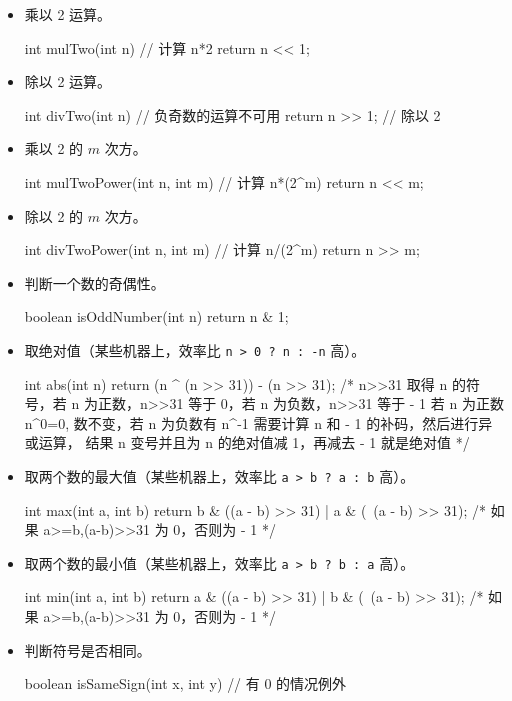 \begin{itemize}
\item 乘以 2 运算。
\begin{cppcode}
int mulTwo(int n) {  // 计算 n*2
  return n << 1;
}
\end{cppcode}
\item 除以 2 运算。
\begin{cppcode}
int divTwo(int n) {  // 负奇数的运算不可用
  return n >> 1;     // 除以 2
}
\end{cppcode}
\item 乘以 2 的 $m$ 次方。
\begin{cppcode}
int mulTwoPower(int n, int m) {  // 计算 n*(2^m)
  return n << m;
}
\end{cppcode}
\item 除以 2 的 $m$ 次方。
\begin{cppcode}
int divTwoPower(int n, int m) {  // 计算 n/(2^m)
  return n >> m;
}
\end{cppcode}
\item 判断一个数的奇偶性。
\begin{cppcode}
boolean isOddNumber(int n) { return n & 1; }
\end{cppcode}
\item 取绝对值（某些机器上，效率比 \texttt{n > 0 ? n : -n} 高）。
\begin{cppcode}
int abs(int n) {
  return (n ^ (n >> 31)) - (n >> 31);
  /* n>>31 取得 n 的符号，若 n 为正数，n>>31 等于 0，若 n 为负数，n>>31 等于 - 1
     若 n 为正数 n^0=0, 数不变，若 n 为负数有 n^-1
     需要计算 n 和 - 1 的补码，然后进行异或运算，
     结果 n 变号并且为 n 的绝对值减 1，再减去 - 1 就是绝对值 */
}
\end{cppcode}
\item 取两个数的最大值（某些机器上，效率比 \texttt{a > b ? a : b} 高）。
\begin{cppcode}
int max(int a, int b) {
  return b & ((a - b) >> 31) | a & (~(a - b) >> 31);
  /* 如果 a>=b,(a-b)>>31 为 0，否则为 - 1 */
}
\end{cppcode}
\item 取两个数的最小值（某些机器上，效率比 \texttt{a > b ? b : a} 高）。
\begin{cppcode}
int min(int a, int b) {
  return a & ((a - b) >> 31) | b & (~(a - b) >> 31);
  /* 如果 a>=b,(a-b)>>31 为 0，否则为 - 1 */
}
\end{cppcode}
\item 判断符号是否相同。
\begin{cppcode}
boolean isSameSign(int x, int y) {  // 有 0 的情况例外
}
\end{cppcode}
\end{itemize}
